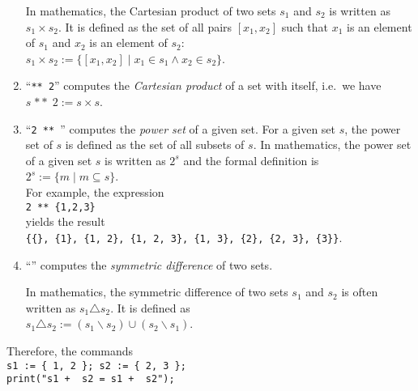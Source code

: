 \begin{enumerate}
      In mathematics, the Cartesian product of two sets $s_1$ and $s_2$ is written
      as $s_1 \times s_2$.  It is defined as the set of all pairs $[x_1,x_2]$ such that $x_1$ is an
      element of $s_1$ and $x_2$ is an element of $s_2$:
      \\[0.2cm]
      \hspace*{1.3cm}
      $s_1 \times s_2 := \{ [x_1,x_2] \mid x_1 \in s_1 \wedge x_2 \in s_2 \}$.
\item ``\texttt{** 2}'' computes the \emph{Cartesian product} of a set with itself,
      i.e.~we have 
      \\[0.2cm]
      \hspace*{1.3cm}
      $s \;\mathtt{**}\; 2 := s \times s$.
\item ``\texttt{2 ** }'' computes the \emph{power set} of a given set.  For a given set
      $s$, the power set of $s$ is defined as the set of all subsets of $s$.
      In mathematics, the power set of a given set $s$ is written as $2^s$ and the formal
      definition is
      \\[0.2cm]
      \hspace*{1.3cm}
      $2^s := \{ m \mid m \subseteq s \}$.
      \\[0.2cm]
      For example, the expression
      \\[0.2cm]
      \hspace*{1.3cm}
      \texttt{2 ** \{1,2,3\}}
      \\[0.2cm]
      yields the result
      \\[0.2cm]
      \hspace*{1.3cm}
      \texttt{\{\{\}, \{1\}, \{1, 2\}, \{1, 2, 3\}, \{1, 3\}, \{2\}, \{2, 3\}, \{3\}\}}.
\item ``\texttt{}'' computes the \emph{symmetric difference} of two sets.

      In mathematics, the symmetric difference of two sets $s_1$ and $s_2$ is often written
      as $s_1 \triangle s_2$.  It is defined as
      \\[0.2cm]
      \hspace*{1.3cm}
      $s_1 \triangle s_2 := (s_1 \backslash s_2) \cup (s_2 \backslash s_1)$.
\end{enumerate}
Therefore, the commands
\\[0.2cm]
\hspace*{1.3cm}
\texttt{s1 := \{ 1, 2 \}; s2 := \{ 2, 3 \};}
\\
\hspace*{1.3cm}
\texttt{print("s1 + \ s2 = s1 + \ s2");}
